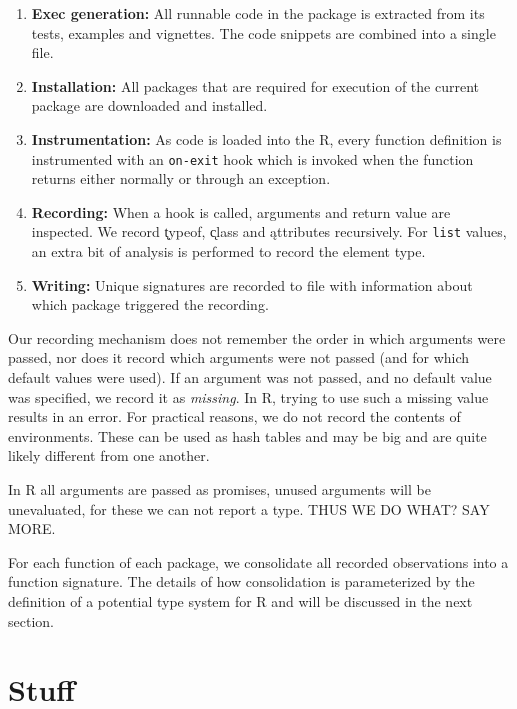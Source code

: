 \documentclass[acmsmall,10pt,review,anonymous]{acmart}\settopmatter{printfolios=true,printccs=false,printacmref=false}
\newcommand{\code}[1]{\lstinline|#1|\xspace}
\begin{document}
\begin{enumerate}
\item {\bf Exec generation:} All runnable code in the package is extracted
  from its tests, examples and vignettes. The code snippets are combined
  into a single file.
\item {\bf Installation:} All packages that are required for execution of
  the current package are downloaded and installed.
\item {\bf Instrumentation:} As code is loaded into the R, every function
  definition is instrumented with an \code{on-exit} hook which is invoked
  when the function returns either normally or through an exception.
\item {\bf Recording:} When a hook is called, arguments and return value are
  inspected. We record \k{typeof}, \k{class} and \k{attributes} recursively.
  For \code{list} values, an extra bit of analysis is performed to record
  the element type.
\item {\bf Writing:} Unique signatures are recorded to file with information
  about which package triggered the recording.
\end{enumerate}

Our recording mechanism does not remember the order in which arguments were
passed, nor does it record which arguments were not passed (and for which
default values were used). If an argument was not passed, and no default
value was specified, we record it as \emph{missing}. In R, trying to use
such a missing value results in an error. For practical reasons, we do not
record the contents of environments. These can be used as hash tables and
may be big and are quite likely different from one another.

In R all arguments are passed as promises, unused arguments will be
unevaluated, for these we can not report a type. THUS WE DO WHAT? SAY MORE.

For each function of each package, we consolidate all recorded observations
into a function signature. The details of how consolidation is parameterized
by the definition of a potential type system for R and will be discussed in
the next section.

\section{Stuff}

\end{document}
